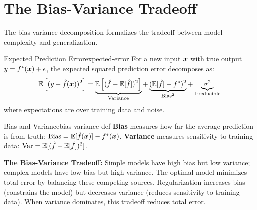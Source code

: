 \documentclass[../../main.tex]{subfiles}
\begin{document}
\section{The Bias-Variance Tradeoff}
\label{sec:bias-variance}

The bias-variance decomposition formalizes the tradeoff between model complexity and generalization.

\begin{theorem}{Expected Prediction Error}{expected-error}
For a new input $\boldsymbol{x}$ with true output $y = f^*(\boldsymbol{x}) + \epsilon$, the expected squared prediction error decomposes as:
\[
    \operatorname{\mathbb{E}}\left[(y - \hat{f}(\boldsymbol{x}))^2\right] = \underbrace{\operatorname{\mathbb{E}}\left[(\hat{f} - \operatorname{\mathbb{E}}[\hat{f}])^2\right]}_{\text{Variance}} + \underbrace{(\operatorname{\mathbb{E}}[\hat{f}] - f^*)^2}_{\text{Bias}^2} + \underbrace{\sigma^2}_{\text{Irreducible}}
\]
where expectations are over training data and noise.
\end{theorem}

\begin{definition}{Bias and Variance}{bias-variance-def}
\textbf{Bias} measures how far the average prediction is from truth: $\text{Bias} = \operatorname{\mathbb{E}}[\hat{f}(\boldsymbol{x})] - f^*(\boldsymbol{x})$. \textbf{Variance} measures sensitivity to training data: $\text{Var} = \operatorname{\mathbb{E}}[(\hat{f} - \operatorname{\mathbb{E}}[\hat{f}])^2]$.
\end{definition}

\begin{principle}
\textbf{The Bias-Variance Tradeoff:} Simple models have high bias but low variance; complex models have low bias but high variance. The optimal model minimizes total error by balancing these competing sources. Regularization increases bias (constrains the model) but decreases variance (reduces sensitivity to training data). When variance dominates, this tradeoff reduces total error.
\end{principle}
\end{document}
